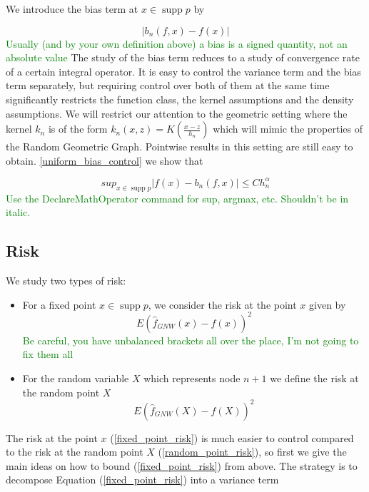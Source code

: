 \documentclass{article}
\newcommand\SB[1]{\textcolor{green}{#1}}
\DeclareMathOperator\supp{supp}
\begin{document}
  
We introduce the bias term at $x\in\supp{p}$ by

\begin{equation}
\label{bias_term}
    |b_n(f,x)-f(x)|
  \end{equation}
\SB{Usually (and by your own definition above) a bias is a signed quantity, not an absolute value}  
The study of the bias term reduces to a study of convergence rate of a certain integral operator.
It is easy to control the variance term and the bias term separately, but requiring control over both of them at the same time significantly restricts the function class, the kernel assumptions and the density assumptions. We will restrict our attention to the geometric setting where the kernel $k_n$ is of the form $k_n(x,z)=K(\frac{x-z}{h_n})$ which will mimic the properties of the Random Geometric Graph. Pointwise results in this setting are still easy to obtain.
\ref{uniform_bias_control} we show that

\begin{equation*}
    sup_{x\in\supp{p}}|f(x)-b_n(f,x)|\leq Ch^{\alpha}_n
\end{equation*}
\SB{Use the DeclareMathOperator command for sup, argmax, etc. Shouldn't be in
  italic. }
\subsection{Risk}
We study two types of risk:
\begin{itemize}
    \item For a fixed point $x\in\supp{p}$, we consider the risk at the point $x$ given by
\begin{equation}
\label{fixed_point_risk}
    E(\hat{f}_{GNW}(x)-f(x))^2
  \end{equation}
  \SB{Be careful, you have unbalanced brackets all over the place, I'm not going
  to fix them all}
    \item For the random variable $X$ which represents node $n+1$ we define the risk at the random point $X$
\begin{equation}
\label{random_point_risk}
    E(\hat{f}_{GNW}(X)-f(X))^2
\end{equation}
\end{itemize}

The risk at the point $x$ (\ref{fixed_point_risk}) is much easier to control compared to the risk at the random point $X$ (\ref{random_point_risk}), so first we give the main ideas on how to bound (\ref{fixed_point_risk}) from above. The strategy is to decompose Equation (\ref{fixed_point_risk}) into a variance term
\end{document}
